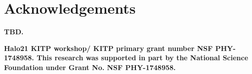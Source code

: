 \documentclass[fleqn,usenatbib]{mnras}
\newcommand{\Rcon}{R_{T=10^5\,{\rm K}}}
\begin{document}
\section*{Acknowledgements}

\textbf{TBD.}

\textbf{Halo21 KITP workshop/ KITP primary grant number NSF PHY-1748958.
This research was supported in part by the National Science Foundation under Grant No. NSF PHY-1748958.
}










\appendix





\bsp	%
\label{lastpage}
\end{document}
